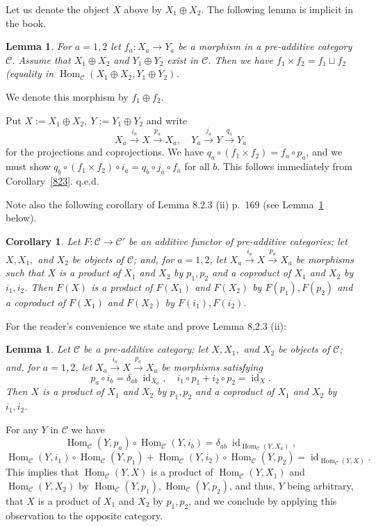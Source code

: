 \documentclass[12pt]{article}
\newtheorem{lem}[thm]{Lemma}
\newtheorem{cor}[thm]{Corollary}
\theoremstyle{remark}
\theoremstyle{definition}
\newcommand{\n}{\noindent}
\newcommand{\C}{\mathcal C}
\newcommand{\xr}{\xrightarrow}
\DeclareMathOperator{\id}{id}
\DeclareMathOperator{\h}{Hom}
\begin{document}
Let us denote the object $X$ above by $X_1\oplus X_2$. The following lemma is implicit in the book. 

\begin{lem}
For $a=1,2$ let $f_a:X_a\to Y_a$ be a morphism in a pre-additive category $\C$. Assume that $X_1\oplus X_2$ and $Y_1\oplus Y_2$ exist in $\C$. Then we have $f_1\times f_2=f_1\sqcup f_2$ (equality in $\h_\C(X_1\oplus X_2,Y_1\oplus Y_2)$. 
\end{lem} 

We denote this morphism by $f_1\oplus f_2$.\medskip 

\n{\em Proof.} Put $X:=X_1\oplus X_2,\ Y:=Y_1\oplus Y_2$ and write 
$$
X_a\xr{i_a}X\xr{p_a}X_a,\quad Y_a\xr{j_a}Y\xr{q_a}Y_a
$$ 
for the projections and coprojections. We have $q_a\circ(f_1\times f_2)=f_a\circ p_a$, and we must show $q_b\circ (f_1\times f_2)\circ i_a=q_b\circ j_a\circ f_a$ for all $b$. This follows immediately from Corollary~\ref{823}. q.e.d. 

Note also the following corollary of Lemma 8.2.3 (ii) p.~169 (see Lemma~\ref{823ii} below). 
%
\begin{cor}\label{823b}
Let $F:\C\to\C'$ be an additive functor of pre-additive categories; let $X,X_1,$ and $X_2$ be objects of $\C$; and, for $a=1,2$, let $X_a\xr{i_a}X\xr{p_a}X_a$ be morphisms such that $X$ is a product of $X_1$ and $X_2$ by $p_1,p_2$ and a coproduct of $X_1$ and $X_2$ by $i_1,i_2$. Then $F(X)$ is a product of $F(X_1)$ and $F(X_2)$ by $F(p_1),F(p_2)$ and a coproduct of $F(X_1)$ and $F(X_2)$ by $F(i_1),F(i_2)$. 
\end{cor}

For the reader's convenience we state and prove Lemma 8.2.3 (ii):
%
\begin{lem}\label{823ii}
Let $\C$ be a pre-additive category; let $X,X_1,$ and $X_2$ be objects of $\C$; and, for $a=1,2$, let $X_a\xr{i_a}X\xr{p_a}X_a$ be morphisms satisfying 
$$
p_a\circ i_b=\delta_{ab}\ \id_{X_a},\quad i_1\circ p_1+i_2\circ p_2=\id_X.
$$
Then $X$ is a product of $X_1$ and $X_2$ by $p_1,p_2$ and a coproduct of $X_1$ and $X_2$ by $i_1,i_2$. 
\end{lem}
%
\n{\em Proof.} For any $Y$ in $\C$ we have 
$$
\h_\C(Y,p_a)\circ\h_\C(Y,i_b)=\delta_{ab}\ \id_{\h_\C(Y,X_a)},
$$ 
$$
\h_\C(Y,i_1)\circ\h_\C(Y,p_1)+\h_\C(Y,i_2)\circ\h_\C(Y,p_2)=\id_{\h_\C(Y,X)}.
$$ 
This implies that $\h_\C(Y,X)$ is a product of $\h_\C(Y,X_1)$ and $\h_\C(Y,X_2)$ by $\h_\C(Y,p_1),\h_\C(Y,p_2)$, and thus, $Y$ being arbitrary, that $X$ is a product of $X_1$ and $X_2$ by $p_1,p_2$, and we conclude by applying this observation to the opposite category.
\ec 
\end{document}
